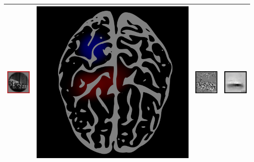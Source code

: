 \documentclass{beamer}
\begin{document}
\begin{frame}
\begin{center}
\begin{tabular}{c||c||c|c}
\includegraphics[scale = 0.22]{i21.png} 
& \includegraphics[scale = 0.035]{brain8.png} 
& \includegraphics[scale = .22]{i22.png}
& \includegraphics[scale = .22]{i23.png}\\ \hline
\end{tabular}
\end{center}
\end{frame}
\end{document}
